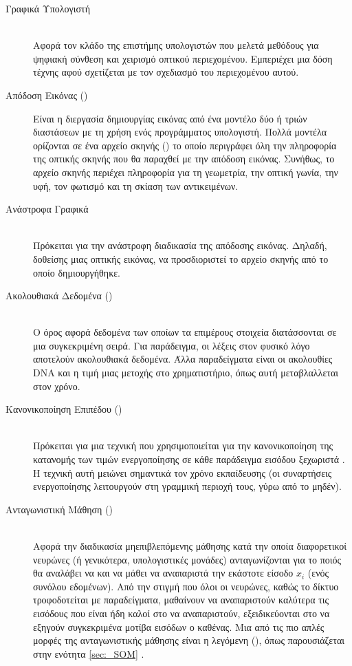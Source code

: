 \begin{description}
    \item[Γραφικά Υπολογιστή] \hfill \\ Αφορά τον κλάδο της επιστήμης υπολογιστών που μελετά μεθόδους για ψηφιακή σύνθεση και χειρισμό οπτικού περιεχομένου. Εμπεριέχει μια δόση τέχνης αφού σχετίζεται με τον σχεδιασμό του περιεχομένου αυτού.
    
    \item[Απόδοση Εικόνας ()] Είναι η διεργασία δημιουργίας εικόνας από ένα μοντέλο δύο ή τριών διαστάσεων με τη χρήση ενός προγράμματος υπολογιστή. Πολλά μοντέλα ορίζονται σε ένα αρχείο σκηνής () το οποίο περιγράφει όλη την πληροφορία της οπτικής σκηνής που θα παραχθεί με την απόδοση εικόνας. Συνήθως, το αρχείο σκηνής περιέχει πληροφορία για τη γεωμετρία, την οπτική γωνία, την υφή, τον φωτισμό και τη σκίαση των αντικειμένων.
    
    \item[Ανάστροφα Γραφικά] \hfill \\ Πρόκειται για την ανάστροφη διαδικασία της απόδοσης εικόνας. Δηλαδή, δοθείσης μιας οπτικής εικόνας, να προσδιοριστεί το αρχείο σκηνής από το οποίο δημιουργήθηκε.
    
    \item[Ακολουθιακά Δεδομένα ()] \hfill \\ Ο όρος αφορά δεδομένα των οποίων τα επιμέρους στοιχεία διατάσσονται σε μια συγκεκριμένη σειρά. Για παράδειγμα, οι λέξεις στον φυσικό λόγο αποτελούν ακολουθιακά δεδομένα. Άλλα παραδείγματα είναι οι ακολουθίες DNA και η τιμή μιας μετοχής στο χρηματιστήριο, όπως αυτή μεταβλαλλεται στον χρόνο.
    \item[Κανονικοποίηση Επιπέδου ()] \hfill \\ Πρόκειται για μια τεχνική που χρησιμοποιείται για την κανονικοποίηση της κατανομής των τιμών ενεργοποίησης σε κάθε παράδειγμα εισόδου ξεχωριστά \cite{ba2016layer_normalization}. Η τεχνική αυτή μειώνει σημαντικά τον χρόνο εκπαίδευσης (οι συναρτήσεις ενεργοποίησης λειτουργούν στη γραμμική περιοχή τους, γύρω από το μηδέν).
    \item[Ανταγωνιστική Μάθηση ()] \hfill \\ Αφορά την διαδικασία μη\textendash επιβλεπόμενης μάθησης κατά την οποία διαφορετικοί νευρώνες (ή γενικότερα, υπολογιστικές μονάδες) ανταγωνίζονται για το ποιός θα αναλάβει να  και να μάθει να αναπαριστά την εκάστοτε είσοδο $x_i$ (ενός συνόλου εδομένων). Από την στιγμή που όλοι οι νευρώνες, καθώς το δίκτυο τροφοδοτείται με παραδείγματα, μαθαίνουν να αναπαριστούν καλύτερα τις εισόδους που είναι ήδη καλοί στο να αναπαριστούν, εξειδικεύονται στο να εξηγούν συγκεκριμένα μοτίβα εισόδων ο καθένας. Μια από τις πιο απλές μορφές της ανταγωνιστικής μάθησης είναι η λεγόμενη  (), όπως παρουσιάζεται στην ενότητα \ref{sec:_SOM} \cite{sammut2011encyclopedia}.
 \end{description}